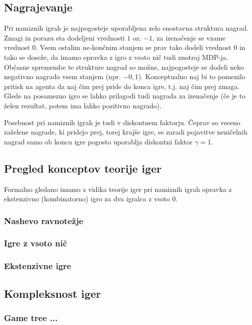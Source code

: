 \documentclass[12pt,a4paper]{amsart}
\theoremstyle{definition} %
\theoremstyle{plain} %
\begin{document}
\subsection{Nagrajevanje}
Pri namiznih igrah je najpogosteje uporabljena zelo enostavna struktura nagrad. Zmagi in porazu sta 
dodeljeni vrednosti $1$ oz. $-1$, za izenačenje se vzame vrednost $0$. Vsem ostalim ne-končnim stanjem
se prav tako dodeli vrednost $0$ in tako se doseže, da imamo opravka z igro z vsoto nič tudi znotraj 
MDP-ja. Občasne spremembe te strukture nagrad so možne, najpogosteje se dodeli neko negativno nagrado 
vsem stanjem (npr. $-0,1$). Konceptualno naj bi to pomenilo pritisk na agenta da naj čim prej pride do 
konca igre, t.j. naj čim prej zmaga. Glede na posamezno igro se lahko prilagodi tudi nagrada za 
izenačenje (če je to želen rezultat, potem ima lahko pozitivno nagrado).

Posebnost pri namiznih igrah je tudi v diskontnem faktorju. Čeprav so vseeno zaželene nagrade, ki 
pridejo prej, torej krajše igre, se zaradi pojavitve neničelnih nagrad samo ob koncu igre pogosto 
uporablja diskontni faktor $\gamma = 1$.

\subsection{Pregled konceptov teorije iger}
Formalno gledano imamo z vidika teorije iger pri namiznih igrah opravka z ekstenzivno (kombinatorno) 
igro za dva igralca z vsoto 0.

\subsubsection{Nashevo ravnotežje}
\subsubsection{Igre z vsoto nič}
\subsubsection{Ekstenzivne igre}

\subsection{Kompleksnost iger}
\subsubsection{Game tree ...}
\end{document}
